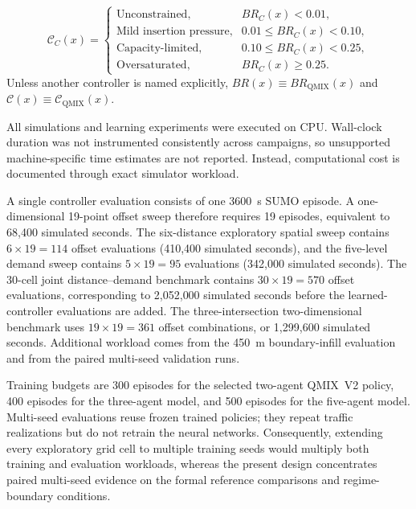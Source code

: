 \documentclass[12pt]{article}
\newcommand{\suppsec}[1]{%
  \bigskip\par\noindent{\large\bfseries #1}\par\medskip}
\begin{document}
\begin{equation}
\mathcal{C}_C(x)=
\begin{cases}
\text{Unconstrained},           & BR_C(x)<0.01,\\
\text{Mild insertion pressure}, & 0.01\leq BR_C(x)<0.10,\\
\text{Capacity-limited},        & 0.10\leq BR_C(x)<0.25,\\
\text{Oversaturated},           & BR_C(x)\geq 0.25 .
\end{cases}
\label{eq:brc}
\end{equation}
Unless another controller is named explicitly,
$BR(x)\equiv BR_{\mathrm{QMIX}}(x)$ and
$\mathcal{C}(x)\equiv\mathcal{C}_{\mathrm{QMIX}}(x)$.

\suppsec{S-2\quad Computational workload}

All simulations and learning experiments were executed on CPU. Wall-clock duration was not instrumented consistently across campaigns, so unsupported machine-specific time estimates are not reported. Instead, computational cost is documented through exact simulator workload.

A single controller evaluation consists of one 3600~s SUMO episode. A one-dimensional 19-point offset sweep therefore requires 19 episodes, equivalent to 68{,}400 simulated seconds. The six-distance exploratory spatial sweep contains $6\times19=114$ offset evaluations (410{,}400 simulated seconds), and the five-level demand sweep contains $5\times19=95$ evaluations (342{,}000 simulated seconds). The 30-cell joint distance--demand benchmark contains $30\times19=570$ offset evaluations, corresponding to 2{,}052{,}000 simulated seconds before the learned-controller evaluations are added. The three-intersection two-dimensional benchmark uses $19\times19=361$ offset combinations, or 1{,}299{,}600 simulated seconds. Additional workload comes from the 450~m boundary-infill evaluation and from the paired multi-seed validation runs.

Training budgets are 300 episodes for the selected two-agent QMIX~V2 policy, 400 episodes for the three-agent model, and 500 episodes for the five-agent model. Multi-seed evaluations reuse frozen trained policies; they repeat traffic realizations but do not retrain the neural networks. Consequently, extending every exploratory grid cell to multiple training seeds would multiply both training and evaluation workloads, whereas the present design concentrates paired multi-seed evidence on the formal reference comparisons and regime-boundary conditions.
\end{document}
